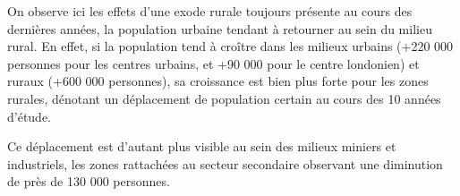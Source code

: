 On observe ici les effets d'une exode rurale toujours présente au cours des dernières années, la population urbaine tendant à retourner au sein du milieu rural. En effet, si la population tend à croître dans les milieux urbains (+220 000 personnes pour les centres urbains, et +90 000 pour le centre londonien) et ruraux (+600 000 personnes), sa croissance est bien plus forte pour les zones rurales, dénotant un déplacement de population certain au cours des 10 années d'étude.

Ce déplacement est d'autant plus visible au sein des milieux miniers et industriels, les zones rattachées au secteur secondaire observant une diminution de près de 130 000 personnes.
\pagebreak

